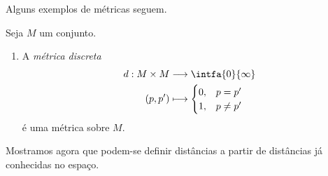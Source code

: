 Alguns exemplos de métricas seguem.

\begin{prop}
Seja $M$ um conjunto.
	\begin{enumerate}
	\item A \emph{métrica discreta}
		\begin{align*}
		\func{d}{M \times M}{\intfa{0}{\infty}}{(p,p')}{
			\begin{cases}
				0,& p = p' \\
				1,& p \neq p'
			\end{cases}
		}
		\end{align*}
é uma métrica sobre $M$.

	\end{enumerate}
\end{prop}

Mostramos agora que podem-se definir distâncias a partir de distâncias já conhecidas no espaço.

